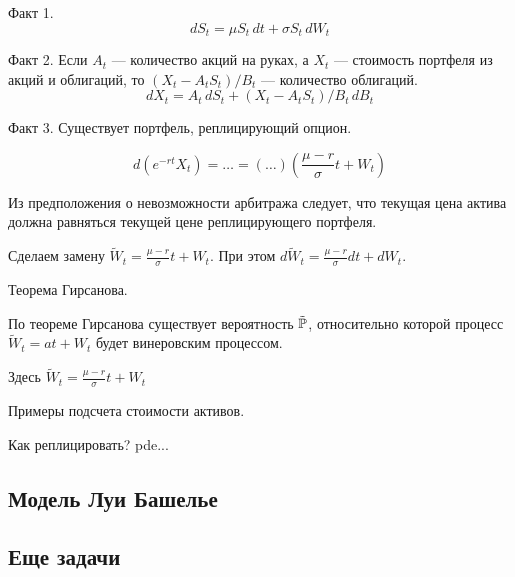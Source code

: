 {Факт 1. 
\[
dS_t=\mu S_t \, dt + \sigma S_t \, dW_t
\]

Факт 2. Если $A_t$ --- количество акций на руках, а $X_t$ --- стоимость портфеля из акций и облигаций, то $(X_t - A_t S_t)/B_t$ --- количество облигаций.
\[
dX_t = A_t \, dS_t + (X_t - A_t S_t)/B_t \, dB_t
\]

Факт 3. Существует портфель, реплицирующий опцион.

\[
d(e^{-rt}X_t)= \ldots = (\ldots) \left( \frac{\mu - r}{\sigma } t + W_t  \right)
\]

Из предположения о невозможности арбитража следует, что текущая цена актива должна равняться текущей цене реплицирующего портфеля.

Сделаем замену $\tilde{W}_t=\frac{\mu - r}{\sigma } t + W_t$. При этом $d\tilde{W}_t = \frac{\mu - r}{\sigma } dt + dW_t$.


Теорема Гирсанова.

По теореме Гирсанова существует вероятность $\tilde{\mathbb{P}}$, относительно которой процесс $\tilde{W}_t=at + W_t$ будет винеровским процессом. 

Здесь $\tilde{W}_t=\frac{\mu-r}{\sigma}t + W_t$



Примеры подсчета стоимости активов.

Как реплицировать? pde...

}\subsection{Модель Луи Башелье} \subsection{Еще задачи}






